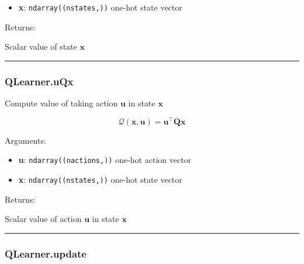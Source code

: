 \begin{itemize}
\tightlist
\item
  \textbf{x}: \texttt{ndarray((nstates,))} one-hot state vector
\end{itemize}

Returns:

Scalar value of state \(\mathbf x\)

\begin{center}\rule{0.5\linewidth}{\linethickness}\end{center}

\subsubsection{QLearner.uQx}\label{qlearner.uqx}

\begin{Shaded}
\begin{Highlighting}[]
\end{Highlighting}
\end{Shaded}

Compute value of taking action \(\mathbf u\) in state \(\mathbf x\)

\[
\mathcal Q(\mathbf x, \mathbf u) = \mathbf u^\top \mathbf Q \mathbf x
\]

Arguments:

\begin{itemize}
\tightlist
\item
  \textbf{u}: \texttt{ndarray((nactions,))} one-hot action vector
\item
  \textbf{x}: \texttt{ndarray((nstates,))} one-hot state vector
\end{itemize}

Returns:

Scalar value of action \(\mathbf u\) in state \(\mathbf x\)

\begin{center}\rule{0.5\linewidth}{\linethickness}\end{center}

\subsubsection{QLearner.update}\label{qlearner.update}

\begin{Shaded}
\begin{Highlighting}[]
\end{Highlighting}
\end{Shaded}

